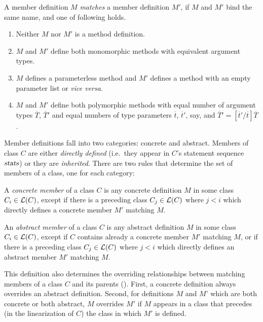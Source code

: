 \begin{definition}
A member definition $M$ {\em matches} a member definition $M'$, if $M$
and $M'$ bind the same name, and one of following holds.
\begin{enumerate}
\item Neither $M$ nor $M'$ is a method definition.
\item $M$ and $M'$ define both monomorphic methods with equivalent argument
  types.
\item $M$ defines a parameterless method and $M'$ defines a method
  with an empty parameter list \code{()} or {\em vice versa}. 
\item $M$ and $M'$ define both polymorphic methods with 
equal number of argument types $\overline T$, $\overline T'$
and equal numbers of type parameters
$\overline t$, $\overline t'$, say, and $\overline T' = [\overline t'/\overline t]\overline T$.
\end{enumerate}
\end{definition}
Member definitions fall into two categories: concrete and abstract.
Members of class $C$ are either {\em directly defined} (i.e.\ they appear in
$C$'s statement sequence $\mbox{\sl stats}$) or they are {\em inherited}.  There are two rules
that determine the set of members of a class, one for each category:

\begin{definition}\label{def:member}
A {\em concrete member} of a class $C$ is any concrete definition $M$ in
some class $C_i \in {\cal L}(C)$, except if there is a preceding class $C_j
\in {\cal L}(C)$ where $j < i$ which directly defines a concrete member $M'$ matching $M$.  

An {\em abstract member} of a class $C$ is any abstract definition $M$
in some class $C_i \in {\cal L}(C)$, except if $C$ contains already a
concrete member $M'$ matching $M$, or if there is a preceding class
$C_j \in {\cal L}(C)$ where $j < i$ which directly defines an abstract member $M'$ matching
$M$.
\end{definition}
This definition also determines the overriding relationships between
matching members of a class $C$ and its parents ().  
First, a concrete definition always overrides an abstract definition.  Second, for
definitions $M$ and $M$' which are both concrete or both abstract, $M$
overrides $M'$ if $M$ appears in a class that precedes (in the
linearization of $C$) the class in which $M'$ is defined.

